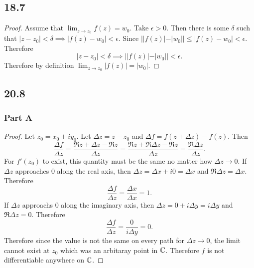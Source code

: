 \documentclass[12pt,titlepage]{extarticle}
\begin{document}
\subsection*{18.7}
\begin{proof}
    Assume that $\lim_{z\to z_0} f(z) = w_0$. Take $\epsilon > 0$. Then there is some $\delta$ such that $|z - z_0| < \delta \implies |f(z) - w_0| < \epsilon$. Since $||f(z)| - |w_0|| \leq |f(z) - w_0| < \epsilon$. Therefore
    \[
        |z - z_0| < \delta \implies ||f(z)| - |w_0|| < \epsilon
    .\]
    Therefore by definition $\lim_{z \to z_0} |f(z)| = |w_0|$.
\end{proof}

\subsection*{20.8}
\subsubsection*{Part A}
\begin{proof}
    Let $z_0 = x_0 + i y_0$. Let $\Delta z = z - z_0$ and $\Delta f = f(z + \Delta z) - f(z)$. Then
    \[
        \frac{\Delta f}{\Delta z} = \frac{\Re{z + \Delta z} - \Re{z}}{\Delta z} = \frac{\Re{z} + \Re{\Delta z} - \Re{z}}{\Delta z} = \frac{\Re{\Delta z}}{\Delta z}
    .\]
    For $f'(z_0)$ to exist, this quantity must be the same no matter how $\Delta z \to 0$. If $\Delta z$ approaches $0$ along the real axis, then $\Delta z = \Delta x + i 0 = \Delta x$ and $\Re{\Delta z} = \Delta x$. Therefore
    \[
        \frac{\Delta f}{\Delta z} = \frac{\Delta x}{\Delta x} = 1
    .\]
    If $\Delta z$ approachs $0$ along the imaginary axis, then $\Delta z = 0 + i \Delta y = i \Delta y$ and $\Re{\Delta z} = 0$. Therefore
    \[
        \frac{\Delta f}{\Delta z} = \frac{0}{i\Delta y} = 0
    .\]
    Therefore since the value is not the same on every path for $\Delta z \to 0$, the limit cannot exist at $z_0$ which was an arbitaray point in $\mathbb{C}$. Therefore $f$ is not differentiable anywhere on $\mathbb{C}$.
\end{proof}
\end{document}
